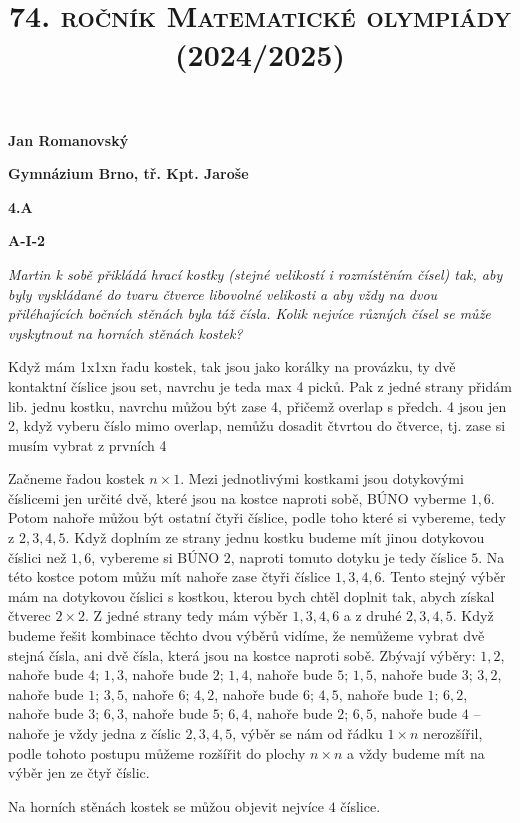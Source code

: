 \documentclass{article}
\title{\normalsize{\vspace{-2cm}\textsc{74. ročník Matematické olympiády (2024/2025)}\vspace{-1.7cm}}}
\date{}
\author{}
\begin{document}
\maketitle

\textbf{ }

\noindent \textbf{Jan Romanovský}

\noindent \textbf{Gymnázium Brno, tř. Kpt. Jaroše}

\noindent \textbf{4.A}

\noindent \textbf{A-\textrm{I}-2}

\textbf{ }

\textit{Martin k sobě přikládá hrací kostky (stejné velikostí i rozmístěním čísel) tak, aby byly vyskládané do tvaru čtverce libovolné velikosti a aby vždy na dvou přiléhajících bočních stěnách byla táž čísla. Kolik nejvíce různých čísel se může vyskytnout na horních stěnách kostek?}

\textbf{ }

Když mám 1x1xn řadu kostek, tak jsou jako korálky na provázku, ty dvě kontaktní číslice jsou set, navrchu je teda max 4 picků. Pak z jedné strany přidám lib. jednu kostku, navrchu můžou být zase 4, přičemž overlap s předch. 4 jsou jen 2, když vyberu číslo mimo overlap, nemůžu dosadit čtvrtou do čtverce, tj. zase si musím vybrat z prvních 4

Začneme řadou kostek $n \times 1$. Mezi jednotlivými kostkami jsou dotykovými číslicemi jen určité dvě, které jsou na kostce naproti sobě, BÚNO vyberme $1, 6$. Potom nahoře můžou být ostatní čtyři číslice, podle toho které si vybereme, tedy z $2, 3, 4, 5$. Když doplním ze strany jednu kostku budeme mít jinou dotykovou číslici než $1, 6$, vybereme si BÚNO $2$, naproti tomuto dotyku je tedy číslice $5$. Na této kostce potom můžu mít nahoře zase čtyři číslice $1, 3, 4, 6$. Tento stejný výběr mám na dotykovou číslici s kostkou, kterou bych chtěl doplnit tak, abych získal čtverec $2 \times 2$. Z jedné strany tedy mám výběr $1,3,4,6$ a z druhé $2,3,4,5$. Když budeme řešit kombinace těchto dvou výběrů vidíme, že nemůžeme vybrat dvě stejná čísla, ani dvě čísla, která jsou na kostce naproti sobě. Zbývají výběry: $1,2$, nahoře bude $4$; $1,3$, nahoře bude $2$; $1,4$, nahoře bude $5$; $1,5$, nahoře bude $3$; $3,2$, nahoře bude $1$; $3,5$, nahoře $6$; $4,2$, nahoře bude $6$; $4 ,5$, nahoře bude $1$; $6,2$, nahoře bude $3$; $6,3$, nahoře bude $5$; $6,4$, nahoře bude $2$; $6,5$, nahoře bude $4$ -- nahoře je vždy jedna z číslic $2, 3, 4, 5$, výběr se nám od řádku $1 \times n$ nerozšířil, podle tohoto postupu můžeme rozšířit do plochy $n \times n$ a vždy budeme mít na výběr jen ze čtyř číslic.

Na horních stěnách kostek se můžou objevit nejvíce $4$ číslice.
\end{document}
